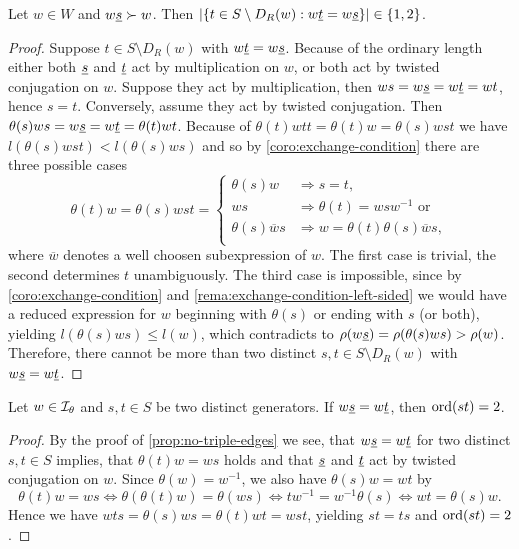 \begin{prop}
	Let $w \in W$ and $w \underline{s} \succ w$. Then $|\{ t \in S \setminus D_R(w) : w \underline{t} = w \underline{s} \}| \in \{1,2\}$.

	\begin{proof}
		Suppose $t \in S \setminus D_R(w)$ with $w \underline{t} = w \underline{s}$. Because of the ordinary length either both $\underline{s}$ and $\underline{t}$ act by multiplication on $w$, or both act by twisted conjugation on $w$. Suppose they act by multiplication, then $ws = w \underline{s} = w \underline{t} = wt$, hence $s = t$. Conversely, assume they act by twisted conjugation. Then $\theta(s) w s = w \underline{s} = w \underline{t} = \theta(t)wt$. Because of $\theta(t) w t t = \theta(t) w = \theta(s) w s t$ we have $l(\theta(s) w s t) < l(\theta(s) w s)$ and so by \ref{coro:exchange-condition} there are three possible cases
		$$ \theta(t)w = \theta(s) w s t = \begin{cases}
			\theta(s) w & \Rightarrow s = t, \\
			w s & \Rightarrow \theta(t) = w s w^{-1} \textrm{ or} \\
			\theta(s) \overline w s & \Rightarrow w = \theta(t) \theta(s) \overline w s, \\
		\end{cases} $$
		where $\overline w$ denotes a well choosen subexpression of $w$. The first case is trivial, the second determines $t$ unambiguously. The third case is impossible, since by \ref{coro:exchange-condition} and \ref{rema:exchange-condition-left-sided} we would have a reduced expression for $w$ beginning with $\theta(s)$ or ending with $s$ (or both), yielding $l(\theta(s)ws) \leq l(w)$, which contradicts to $\rho(w \underline{s}) = \rho(\theta(s)ws) > \rho(w)$. Therefore, there cannot be more than two distinct $s,t \in S \setminus D_R(w)$ with $w \underline{s} = w \underline{t}$.
	\end{proof}
\end{prop}

\begin{coro}
	Let $w \in \mathcal{I}_{\theta}$ and $s,t \in S$ be two distinct generators. If $w \underline{s} = w \underline{t}$, then $\operatorname{ord}(st) = 2$.

	\begin{proof}
		By the proof of \ref{prop:no-triple-edges} we see, that $w \underline{s} = w \underline{t}$ for two distinct $s,t \in S$ implies, that $\theta(t)w = ws$ holds and that $\underline{s}$ and $\underline{t}$ act by twisted conjugation on $w$. Since $\theta(w) = w^{-1}$, we also have $\theta(s)w = wt$ by
		$$ \theta(t)w = ws \iff \theta(\theta(t)w) = \theta(ws) \iff tw^{-1} = w^{-1} \theta(s) \iff wt = \theta(s)w. $$
		Hence we have $wts = \theta(s)ws = \theta(t)wt = wst$, yielding $st = ts$ and $\operatorname{ord}(st) = 2$.
	\end{proof}
\end{coro}

\todo